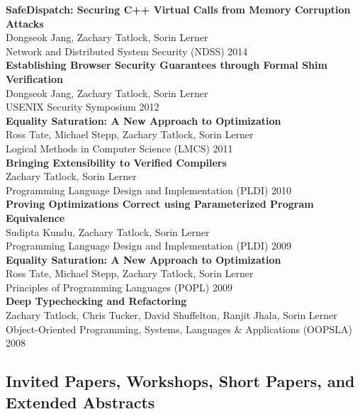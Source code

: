 \documentclass[10pt]{article}
\begin{document}
\textbf{%
SafeDispatch: Securing C++ Virtual Calls from Memory Corruption Attacks
} \\
Dongseok Jang, Zachary Tatlock, Sorin Lerner \\
Network and Distributed System Security (NDSS) 2014 \\

\textbf{%
Establishing Browser Security Guarantees through Formal Shim Verification
} \\
Dongseok Jang, Zachary Tatlock, Sorin Lerner \\
USENIX Security Symposium 2012 \\

\textbf{%
Equality Saturation: A New Approach to Optimization
} \\
Ross Tate, Michael Stepp, Zachary Tatlock, Sorin Lerner \\
Logical Methods in Computer Science (LMCS) 2011 \\

\textbf{%
Bringing Extensibility to Verified Compilers
} \\
Zachary Tatlock, Sorin Lerner \\
Programming Language Design and Implementation (PLDI) 2010 \\

\textbf{%
Proving Optimizations Correct using Parameterized Program Equivalence
} \\
Sudipta Kundu, Zachary Tatlock, Sorin Lerner \\
Programming Language Design and Implementation (PLDI) 2009 \\

\textbf{%
Equality Saturation: A New Approach to Optimization
} \\
Ross Tate, Michael Stepp, Zachary Tatlock, Sorin Lerner \\
Principles of Programming Languages (POPL) 2009 \\

\textbf{%
Deep Typechecking and Refactoring
} \\
Zachary Tatlock, Chris Tucker, David Shuffelton, Ranjit Jhala, Sorin Lerner \\
Object-Oriented Programming, Systems, Languages \& Applications (OOPSLA) 2008 \\


\subsection*{Invited Papers, Workshops, Short Papers, and Extended Abstracts}
\end{document}

